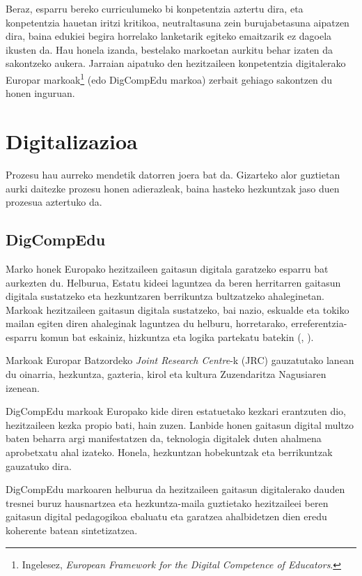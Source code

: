 Beraz, esparru bereko curriculumeko bi konpetentzia aztertu dira, eta konpetentzia hauetan iritzi kritikoa, neutraltasuna zein burujabetasuna aipatzen dira, baina edukiei begira horrelako lanketarik egiteko emaitzarik ez dagoela ikusten da. Hau honela izanda, bestelako markoetan aurkitu behar izaten da sakontzeko aukera. Jarraian aipatuko den hezitzaileen konpetentzia digitalerako Europar markoak\footnote{Ingelesez, \textit{European Framework for the Digital Competence of Educators}.} (edo DigCompEdu markoa) zerbait gehiago sakontzen du honen inguruan.

\section{Digitalizazioa}\label{sec:digitalizazioa}

Prozesu hau aurreko mendetik datorren joera bat da. Gizarteko alor guztietan aurki daitezke prozesu honen adierazleak, baina hasteko hezkuntzak jaso duen prozesua aztertuko da.

\subsection{DigCompEdu}\label{subsec:digcompedu}

Marko honek Europako hezitzaileen gaitasun digitala garatzeko esparru bat aurkezten du. Helburua, Estatu kideei laguntzea da beren herritarren gaitasun digitala sustatzeko eta hezkuntzaren berrikuntza bultzatzeko ahaleginetan. Markoak hezitzaileen gaitasun digitala sustatzeko, bai nazio, eskualde eta tokiko mailan egiten diren ahaleginak laguntzea du helburu, horretarako, erreferentzia-esparru komun bat eskainiz, hizkuntza eta logika partekatu batekin (\citeauthor{JRC107466}, \citeyear{JRC107466}).

Markoak Europar Batzordeko \textit{Joint Research Centre}-k (JRC) gauzatutako lanean du oinarria, hezkuntza, gazteria, kirol eta kultura Zuzendaritza Nagusiaren izenean.

DigCompEdu markoak Europako kide diren estatuetako kezkari erantzuten dio, hezitzaileen kezka propio bati, hain zuzen. Lanbide honen gaitasun digital multzo baten beharra argi manifestatzen da, teknologia digitalek duten ahalmena aprobetxatu ahal izateko. Honela, hezkuntzan hobekuntzak eta berrikuntzak gauzatuko dira.

DigCompEdu markoaren helburua da hezitzaileen gaitasun digitalerako dauden tresnei buruz hausnartzea eta hezkuntza-maila guztietako hezitzaileei beren gaitasun digital pedagogikoa ebaluatu eta garatzea ahalbidetzen dien eredu koherente batean sintetizatzea.

